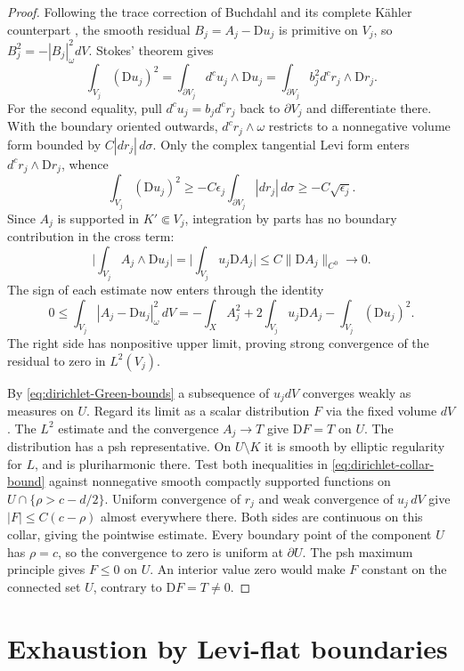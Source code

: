 \documentclass[11pt]{amsart}
\theoremstyle{remark}
\numberwithin{equation}{section}
\newcommand{\D}{\mathrm{D}}
\begin{document}
\begin{proof}
Following the trace correction of Buchdahl
\cite[\S2, especially Lemma~4]{Buchdahl} and its complete K\"ahler
counterpart \cite[Theorem~3.3 and Lemma~4.2]{Oct}, the smooth residual
$B_j=A_j-\D u_j$ is primitive on $V_j$, so
$B_j^2=-|B_j|_\omega^2dV$. Stokes' theorem gives
\[
 \int_{V_j}(\D u_j)^2
   =\int_{\partial V_j} d^cu_j\wedge\D u_j
   =\int_{\partial V_j}b_j^2 d^c r_j\wedge\D r_j.
\]
For the second equality, pull $d^cu_j=b_jd^c r_j$ back to
$\partial V_j$ and differentiate there. With the boundary oriented
outwards, $d^c r_j\wedge\omega$ restricts to a nonnegative volume
form bounded by $C|dr_j|\,d\sigma$. Only the complex tangential
Levi form enters $d^c r_j\wedge\D r_j$, whence
\[
 \int_{V_j}(\D u_j)^2
   \ge -C\epsilon_j \int_{\partial V_j}|dr_j|\,d\sigma
   \ge -C\sqrt{\epsilon_j}.
\]
Since $A_j$ is supported in $K'\Subset V_j$, integration by parts
has no boundary contribution in the cross term:
\[
 \bigg|\int_{V_j} A_j\wedge\D u_j\bigg|
   =\bigg|\int_{V_j} u_j\D A_j\bigg|
   \le C\|\D A_j\|_{C^0}\longrightarrow0 .
\]
The sign of each estimate now enters through the identity
\[
 0\leq\int_{V_j}|A_j-\D u_j|_\omega^2\,dV
 =-\int_X A_j^2+2\int_{V_j}u_j\D A_j-\int_{V_j}(\D u_j)^2 .
\]
The right side has nonpositive upper limit, proving strong convergence
of the residual to zero in $L^2(V_j)$.

By \eqref{eq:dirichlet-Green-bounds} a subsequence of $u_jdV$
converges weakly as measures on $U$. Regard its limit as a scalar
distribution $F$ via the fixed volume $dV$. The $L^2$ estimate and
the convergence $A_j\to T$ give $\D F=T$ on $U$. The distribution
has a psh representative. On $U\setminus K$ it is smooth by
elliptic regularity for $L$, and is pluriharmonic there.
Test both inequalities in \eqref{eq:dirichlet-collar-bound} against
nonnegative smooth compactly supported functions on
$U\cap\{\rho>c-d/2\}$. Uniform convergence of $r_j$ and weak convergence
of $u_j\,dV$ give $|F|\le C(c-\rho)$ almost everywhere there.
Both sides are continuous on this collar, giving the pointwise estimate.
Every boundary point of the component $U$ has $\rho=c$, so the
convergence to zero is uniform at $\partial U$. The psh maximum
principle gives $F\le0$ on $U$. An interior value zero would make
$F$ constant on the connected set $U$, contrary to $\D F=T\ne0$.
\end{proof}

\section{Exhaustion by Levi-flat boundaries}
\end{document}
